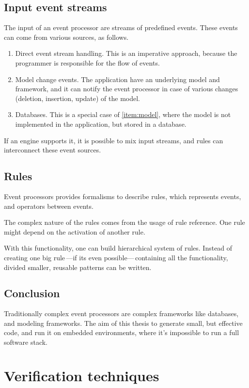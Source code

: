 \subsection{Input event streams}
\label{subsection:event_streams}
The input of an event processor are streams of predefined events. These events can come from various sources, as follows.
\begin{enumerate}
	\item Direct event stream handling. This is an imperative approach, because the programmer is responsible for the flow of events.
	\item\label{item:model} Model change events. The application have an underlying model and framework, and it can notify the event processor in case of various changes (deletion, insertion, update) of the model.
	\item Databases. This is a special case of \cref{item:model}, where the model is not implemented in the application, but stored in a database.
\end{enumerate}
\vspace{1ex}
If an engine supports it, it is possible to mix input streams, and rules can interconnect these event sources.

\subsection{Rules}
\label{subsection:rules}
Event processors provides formalisms to describe rules, which represents events, and operators between events.

The complex nature of the rules comes from the usage of rule reference. One rule might depend on the activation of another rule.

With this functionality, one can build hierarchical system of rules. Instead of creating one big rule\,---if its even possible---\,containing all the functionality, divided smaller, reusable patterns can be written.

\subsection{Conclusion}

Traditionally complex event processors are complex frameworks like databases, and modeling frameworks. The aim of this thesis to generate small, but effective code, and run it on embedded environments, where it's impossible to run a full \cep software stack.

\section{Verification techniques}

